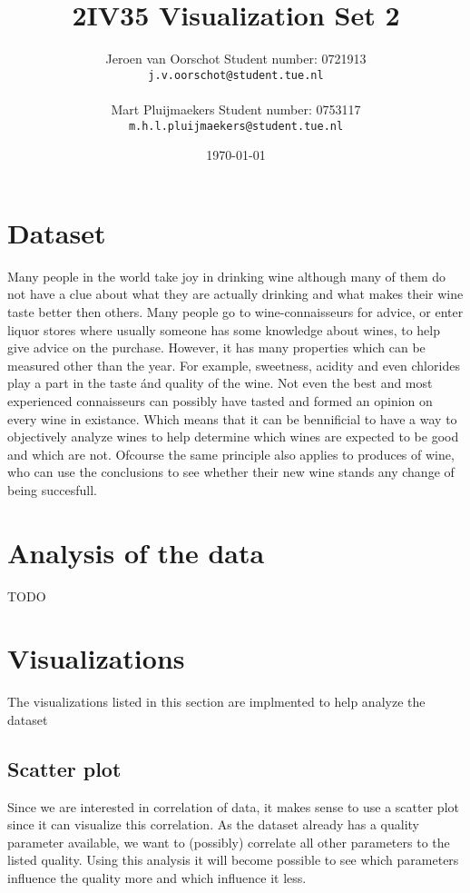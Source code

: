 \documentclass[a4paper,twoside,11pt]{article}
\title{\vspace{-\baselineskip}\sffamily\bfseries 2IV35 Visualization Set 2}
\author{Jeroen van Oorschot \qquad Student number: 0721913 \\{\tt j.v.oorschot@student.tue.nl}\\ \\Mart Pluijmaekers \qquad Student number: 0753117 \\{\tt m.h.l.pluijmaekers@student.tue.nl}}
\date{\today}
\begin{document}
\maketitle

\pagebreak
\tableofcontents
\newpage
\section{Dataset}
Many people in the world take joy in drinking wine although many of them do not have a clue about what they are actually drinking and what makes their wine taste better then others. Many people go to wine-connaisseurs for advice, or enter liquor stores where usually someone has some knowledge about wines, to help give advice on the purchase. However, it has many properties which can be measured other than the year. For example, sweetness, acidity and even chlorides play a part in the taste \'and quality of the wine. Not even the best and most experienced connaisseurs can possibly have tasted and formed an opinion on every wine in existance. Which means that it can be bennificial to have a way to objectively analyze wines to help determine which wines are expected to be good and which are not. Ofcourse the same principle also applies to produces of wine, who can use the conclusions to see whether their new wine stands any change of being succesfull.

\section{Analysis of the data}
TODO


\section{Visualizations}
The visualizations listed in this section are implmented to help analyze the dataset

\subsection{Scatter plot}
Since we are interested in correlation of data, it makes sense to use a scatter plot since it can visualize this correlation. As the dataset already has a quality parameter available, we want to (possibly) correlate all other parameters to the listed quality. Using this analysis it will become possible to see which parameters influence the quality more and which influence it less. \\
\end{document}
